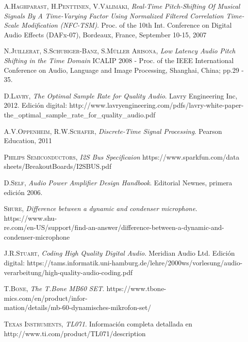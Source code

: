 \documentclass[a4paper, 11pt, oneside, openright]{report}
\begin{document}
\begin{thebibliography}{aa}
	\textsc{A.Haghparast, H.Penttinen, V.Välimäki},
	\textit{Real-Time Pitch-Shifting Of Musical Signals By A Time-Varying Factor Using Normalized Filtered Correlation Time-Scale Modification (NFC-TSM)}.
	Proc. of the 10th Int. Conference on Digital Audio Effects (DAFx-07), Bordeaux, France, September 10-15, 2007
	
	\textsc{N.Juillerat, S.Schubiger-Banz, S.Müller Arisona},
	\textit{Low Latency Audio Pitch Shifting in the Time Domain}
	ICALIP 2008 - Proc. of the IEEE International Conference on Audio, Language and Image Processing, Shanghai, China; pp.29 - 35.
	
	\textsc{D.Lavry},
	\textit{The Optimal Sample Rate for Quality Audio}. Lavry Engineering Inc, 2012. Edición digital: http://www.lavryengineering.com/pdfs/lavry-white-paper-the\_optimal\_sample\_rate\_for\_quality\_audio.pdf
		
	\textsc{A.V.Oppenheim, R.W.Schafer},
	\textit{Discrete-Time Signal Processing}.
	Pearson Education, 2011

	\textsc{Philips Semiconductors},
	\textit{I2S Bus Specificaion}
	https://www.sparkfun.com/data\\sheets/BreakoutBoards/I2SBUS.pdf
	
	\textsc{D.Self},
	\textit{Audio Power Amplifier Design Handbook}. Editorial Newnes, primera edición 2006.
	
	\textsc{Shure},
	\textit{Difference between a dynamic and condenser microphone}. https://www.shu-\\re.com/en-US/support/find-an-answer/difference-between-a-dynamic-and-condenser-microphone
	
	\textsc{J.R.Stuart},
	\textit{Coding High Quality Digital Audio}. Meridian Audio Ltd. Edición\\ digital: https://tams.informatik.uni-hamburg.de/lehre/2000ws/vorlesung/audio-\\verarbeitung/high-quality-audio-coding.pdf

	\textsc{T.Bone},
	\textit{The T.Bone MB60 SET}. https://www.tbone-mics.com/en/product/infor-\\mation/details/mb-60-dynamisches-mikrofon-set/
	
	\textsc{Texas Instruments},
	\textit{TL071}. Información completa detallada en http://www.ti.com/product/TL071/description


\end{thebibliography}
\end{document}
